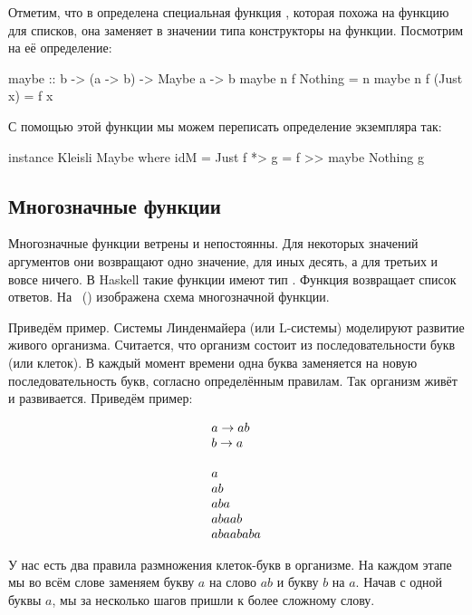 Отметим, что в  определена специальная функция ,
которая похожа на функцию  для списков, она заменяет в
значении типа  конструкторы на функции. Посмотрим на её
определение:


\begin{code}
maybe              :: b -> (a -> b) -> Maybe a -> b
maybe n f Nothing  =  n
maybe n f (Just x) =  f x
\end{code}

С помощью этой функции мы можем переписать определение экземпляра
 так:


\begin{code}
instance Kleisli Maybe where
    idM     = Just
    f *> g  = f >> maybe Nothing g
\end{code}

\subsection{Многозначные функции}

 Многозначные функции ветрены и непостоянны. Для
некоторых значений аргументов они возвращают одно значение, для иных
десять, а для третьих и вовсе ничего. В Haskell такие функции имеют тип
. Функция возвращает список ответов. На ~()
изображена схема многозначной функции.


Приведём пример. Системы Линденмайера (или L-системы) моделируют
развитие живого организма. Считается, что организм состоит из
последовательности букв (или клеток). В каждый момент времени одна буква
заменяется на новую последовательность букв, согласно определённым
правилам. Так организм живёт и развивается. Приведём пример:

\[\begin{array}{l}
    a \rightarrow ab \\
    b \rightarrow a \\
    \\
    a \\
    ab \\
    aba \\
    abaab \\
    abaababa \\
\end{array}\]

У нас есть два правила размножения клеток-букв в организме. На каждом
этапе мы во всём слове заменяем букву $a$ на слово $ab$ и букву $b$ на
$a$. Начав с одной буквы $a$, мы за несколько шагов пришли к более
сложному слову.

